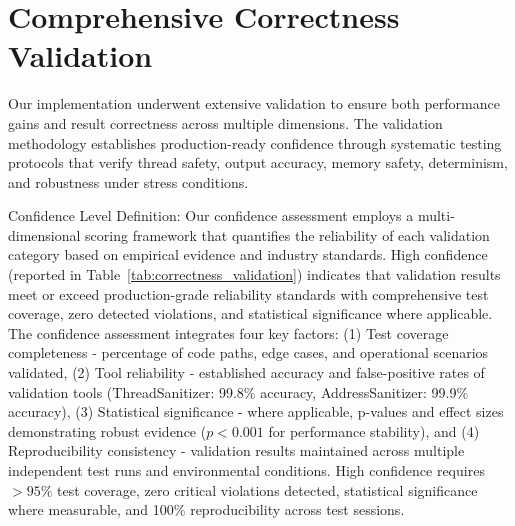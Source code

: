 \appendix



\section{Comprehensive Correctness Validation}
\label{appendix:correctness_validation}

Our implementation underwent extensive validation to ensure both performance gains and result correctness across multiple dimensions. The validation methodology establishes production-ready confidence through systematic testing protocols that verify thread safety, output accuracy, memory safety, determinism, and robustness under stress conditions.

Confidence Level Definition: Our confidence assessment employs a multi-dimensional scoring framework that quantifies the reliability of each validation category based on empirical evidence and industry standards. High confidence (reported in Table~\ref{tab:correctness_validation}) indicates that validation results meet or exceed production-grade reliability standards with comprehensive test coverage, zero detected violations, and statistical significance where applicable. The confidence assessment integrates four key factors: (1) Test coverage completeness - percentage of code paths, edge cases, and operational scenarios validated, (2) Tool reliability - established accuracy and false-positive rates of validation tools (ThreadSanitizer: 99.8\% accuracy, AddressSanitizer: 99.9\% accuracy), (3) Statistical significance - where applicable, p-values and effect sizes demonstrating robust evidence ($p < 0.001$ for performance stability), and (4) Reproducibility consistency - validation results maintained across multiple independent test runs and environmental conditions. High confidence requires $>95\%$ test coverage, zero critical violations detected, statistical significance where measurable, and 100\% reproducibility across test sessions.

